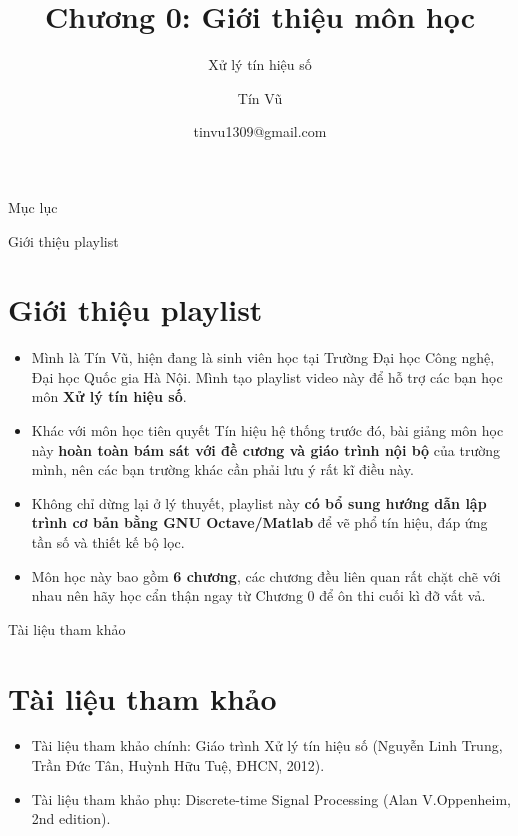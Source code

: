 \documentclass[8pt]{beamer}
\title[Chương 0: Giới thiệu môn học] %
{Chương 0: Giới thiệu môn học}
\subtitle{Xử lý tín hiệu số}
\author[Xử lý tín hiệu số] %
{Tín Vũ}
\date[VLC 2021] %
{tinvu1309@gmail.com}
\begin{document}
\frame{\titlepage}
\begin{frame}{Mục lục}
\tableofcontents
\end{frame}
\begin{frame}{Giới thiệu playlist}
\section{Giới thiệu playlist}
	\begin{itemize}
		\item Mình là Tín Vũ, hiện đang là sinh viên học tại Trường Đại học Công nghệ, Đại học Quốc gia Hà Nội. Mình tạo playlist video này để hỗ trợ các bạn học môn \textbf{Xử lý tín hiệu số}.
\item Khác với môn học tiên quyết \alert{Tín hiệu hệ thống} trước đó, bài giảng môn học này \textbf{hoàn toàn bám sát với đề cương và giáo trình nội bộ} của trường mình, nên các bạn trường khác cần phải lưu ý rất kĩ điều này.
\item Không chỉ dừng lại ở lý thuyết, playlist này \textbf{có bổ sung hướng dẫn lập trình cơ bản bằng GNU Octave/Matlab} để vẽ phổ tín hiệu, đáp ứng tần số và thiết kế bộ lọc.
\item Môn học này bao gồm \textbf{6 chương}, các chương đều liên quan rất chặt chẽ với nhau nên hãy học cẩn thận ngay từ \alert{Chương 0} để ôn thi cuối kì đỡ vất vả.
	\end{itemize}
\end{frame}
\begin{frame}{Tài liệu tham khảo}
\section{Tài liệu tham khảo}
\begin{itemize}
		\item Tài liệu tham khảo chính: Giáo trình Xử lý tín hiệu số (Nguyễn Linh Trung, Trần Đức Tân, Huỳnh Hữu Tuệ, ĐHCN, 2012).
		\item Tài liệu tham khảo phụ: Discrete-time Signal Processing (Alan V.Oppenheim, 2nd edition). 
	\end{itemize}
\end{frame}
\end{document}
